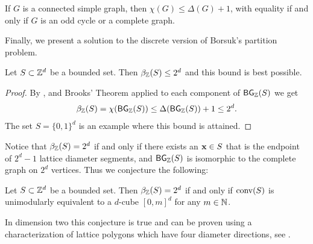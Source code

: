 \begin{theorem}[Brooks, 1941]\label{Thm:Brooks}
    If $G$ is a connected simple graph, then $\chi(G) \leq \Delta(G)+1$, with equality if and only if $G$ is an odd cycle or a complete graph.
\end{theorem}

Finally, we present a solution to the discrete version of Borsuk's partition problem.

\begin{theorem}\label{Thm:Borsuk}
     Let $S \subset \mathbb{Z}^d$ be a bounded set. Then $\beta_{\mathbb{Z}}(S) \leq 2^d$ and this bound is best possible.
\end{theorem}

\begin{proof}
    By ,  and Brooks' Theorem applied to each component of $\operatorname{\mathsf{BG}}_{\mathbb{Z}}(S)$ we get
    \[
    \beta_{\mathbb{Z}}(S) = \chi(\operatorname{\mathsf{BG}}_{\mathbb{Z}}(S)) \leq \Delta (\operatorname{\mathsf{BG}}_{\mathbb{Z}}(S)) +1 \leq 2^d.
    \]
    The set $S=\{0,1\}^d$ is an example where this bound is attained.
\end{proof}

Notice that $\beta_{\mathbb{Z}}(S)= 2^d$ if and only if there exists an $\mathbf{x} \in S$ that is the endpoint of $2^d-1$ lattice diameter segments, and $\operatorname{\mathsf{BG}}_{\mathbb{Z}}(S)$ is isomorphic to the complete graph on $2^d$ vertices. Thus we conjecture the following:
\begin{conjecture}\label{conj:Borsuk}
    Let $S \subset \mathbb{Z}^d$ be a bounded set. Then $\beta_{\mathbb{Z}}(S) =2^d$ if and only if $\operatorname{conv}(S)$ is unimodularly equivalent to a $d$-cube $[0,m]^d$ for any $m \in \mathbb{N}$.
\end{conjecture}

In dimension two this conjecture is true and can be proven using a characterization of lattice polygons which have four diameter directions, see \cite[Theorem~2(iii)]{Barany_Furedi}.